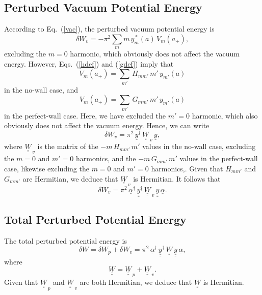 \documentclass[12pt,prb,aps]{revtex4-1}
\begin{document}
\subsection{Perturbed Vacuum Potential Energy}
According to Eq.~(\ref{vac}), the perturbed vacuum potential energy is
\begin{equation}
\delta W_v = - \pi^2\sum_m m\,y_m^{\,\ast}(a)\,V_m(a_+),
\end{equation}
excluding the $m=0$ harmonic, which 
obviously does not affect the vacuum energy. 
However, Eqs.~(\ref{hdef}) and (\ref{gdef}) imply that
\begin{equation}
V_m(a_+) = \sum_{m'}\,H_{mm'}\,m'\,y_{m'}(a)
\end{equation}
in the no-wall case, and 
\begin{equation}
V_m(a_+) = \sum_{m'}\,G_{mm'}\,m'\,y_{m'}(a)
\end{equation}
in the perfect-wall case. Here, we have excluded the $m'=0$ harmonic, which also obviously does not affect the vacuum energy. 
Hence, we can write
\begin{equation}
\delta W_v = \pi^2\,\underline{y}^\dag\,\underline{\underline{W}}_{\,v}\,\underline{y},
\end{equation}
where $\underline{\underline{W}}_{\,v}$ is the matrix of the $-m\,H_{mm'}\,m'$ values in the no-wall case, excluding the $m=0$ and $m'=0$ harmonics, and the
$-m\,G_{mm'}\,m'$ values in the perfect-wall case, likewise  excluding the $m=0$ and $m'=0$ harmonics,. Given that $H_{mm'}$ and $G_{mm'}$ are Hermitian, we deduce that $\underline{\underline{W}}_{\,v}$ 
is Hermitian. It follows that
\begin{equation}
\delta W_v = \pi^2\,\underline{\alpha}^\dag\,\underline{\underline{y}}^\dag\,\underline{\underline{W}}_{\,v}\,\underline{\underline{y}}\,\underline{\alpha}.
\end{equation}

\subsection{Total Perturbed Potential Energy}
The total perturbed potential energy is
\begin{equation}
\delta W = \delta W_p + \delta W_v = \pi^2\,\underline{\alpha}^\dag\,\underline{\underline{y}}^\dag\,\underline{\underline{W}}\,\underline{\underline{y}}\,\underline{\alpha},
\end{equation}
where 
\begin{equation}
\underline{\underline{W}} = \underline{\underline{W}}_{\,p} + \underline{\underline{W}}_{\,v}.
\end{equation}
Given that $\underline{\underline{W}}_{\,p}$ and $\underline{\underline{W}}_{\,v}$ are both Hermitian, we deduce that $\underline{\underline{W}}$ is Hermitian.
\end{document}
